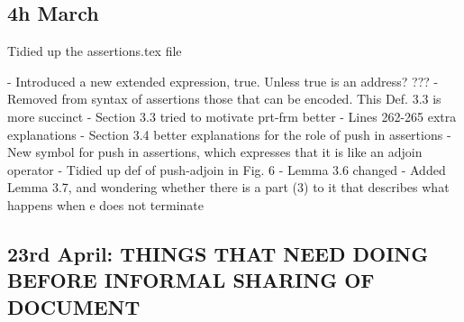 \documentclass[acmsmall,review,anonymous]{acmart}\settopmatter{printfolios=true}
\begin{document}
\subsection*{4h March}

Tidied up the assertions.tex file

- Introduced a new extended expression, true. Unless true is an address? ???
- Removed from syntax of assertions those that can be encoded. This Def. 3.3 is more succinct 
- Section 3.3 tried to motivate prt-frm better 
- Lines 262-265 extra explanations 
- Section 3.4 better explanations for the role of push in assertions 
- New symbol for push in assertions, which expresses that it is like an adjoin operator
- Tidied up def of push-adjoin in Fig. 6
- Lemma 3.6 changed
- Added Lemma 3.7, and wondering whether there is a part (3) to it that describes what happens when e does not terminate

\subsection*{23rd April: THINGS THAT NEED DOING BEFORE INFORMAL SHARING OF DOCUMENT}
 
\end{document}
